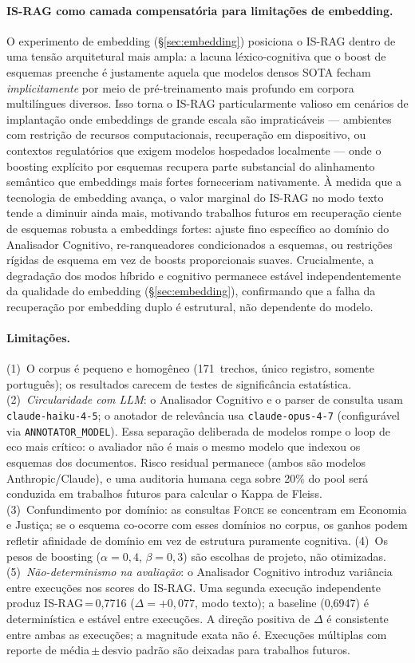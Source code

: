 \documentclass[11pt,a4paper]{article}
\begin{document}
\paragraph{IS-RAG como camada compensatória para limitações de embedding.}
O experimento de embedding (\S\ref{sec:embedding}) posiciona o IS-RAG
dentro de uma tensão arquitetural mais ampla: a lacuna léxico-cognitiva
que o boost de esquemas preenche é justamente aquela que modelos densos
SOTA fecham \emph{implicitamente} por meio de pré-treinamento mais
profundo em corpora multilíngues diversos.
Isso torna o IS-RAG particularmente valioso em cenários de implantação
onde embeddings de grande escala são impraticáveis --- ambientes com
restrição de recursos computacionais, recuperação em dispositivo, ou
contextos regulatórios que exigem modelos hospedados localmente ---
onde o boosting explícito por esquemas recupera parte substancial do
alinhamento semântico que embeddings mais fortes forneceriam nativamente.
À medida que a tecnologia de embedding avança, o valor marginal do
IS-RAG no modo texto tende a diminuir ainda mais, motivando trabalhos
futuros em recuperação ciente de esquemas robusta a embeddings fortes:
ajuste fino específico ao domínio do Analisador Cognitivo,
re-ranqueadores condicionados a esquemas, ou restrições rígidas de
esquema em vez de boosts proporcionais suaves.
Crucialmente, a degradação dos modos híbrido e cognitivo permanece
estável independentemente da qualidade do embedding (\S\ref{sec:embedding}),
confirmando que a falha da recuperação por embedding duplo é estrutural,
não dependente do modelo.

\paragraph{Limitações.}
(1)~O corpus é pequeno e homogêneo (171~trechos, único registro,
somente português); os resultados carecem de testes de significância
estatística.
(2)~\emph{Circularidade com LLM}: o Analisador Cognitivo e o parser
de consulta usam \texttt{claude-haiku-4-5}; o anotador de relevância
usa \texttt{claude-opus-4-7} (configurável via \texttt{ANNOTATOR\_MODEL}).
Essa separação deliberada de modelos rompe o loop de eco mais crítico:
o avaliador não é mais o mesmo modelo que indexou os esquemas dos
documentos.
Risco residual permanece (ambos são modelos Anthropic/Claude), e uma
auditoria humana cega sobre 20\% do pool será conduzida em trabalhos
futuros para calcular o Kappa de Fleiss.
(3)~Confundimento por domínio: as consultas \textsc{Force} se
concentram em Economia e Justiça; se o esquema co-ocorre com esses
domínios no corpus, os ganhos podem refletir afinidade de domínio em
vez de estrutura puramente cognitiva.
(4)~Os pesos de boosting ($\alpha{=}0{,}4$, $\beta{=}0{,}3$) são
escolhas de projeto, não otimizadas.
(5)~\emph{Não-determinismo na avaliação}: o Analisador Cognitivo
introduz variância entre execuções nos scores do IS-RAG.
Uma segunda execução independente produz IS-RAG\,=\,0{,}7716
($\Delta=+0{,}077$, modo texto); a baseline (0{,}6947) é determinística
e estável entre execuções.
A direção positiva de $\Delta$ é consistente entre ambas as execuções;
a magnitude exata não é.
Execuções múltiplas com reporte de média\,$\pm$\,desvio padrão são
deixadas para trabalhos futuros.
\end{document}
